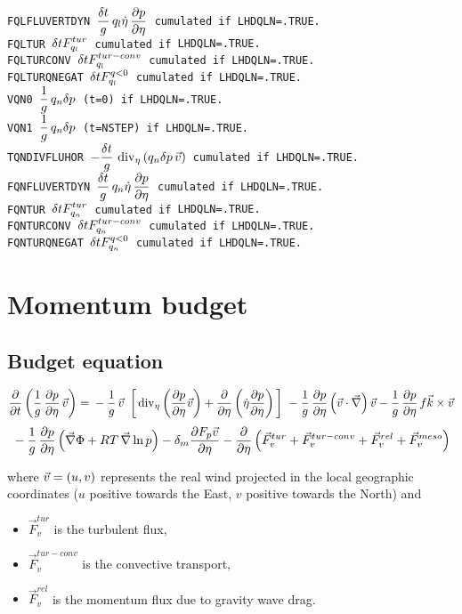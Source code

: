 \begin{tabbing}
\tt FQLFLUVERTDYN \> $\displaystyle\frac{\delta t}g \,q_l\dot\eta\,\frac{\displaystyle \partial p}{\displaystyle \partial \eta}$ \> cumulated \> if {\tt LHDQLN=.TRUE.}\\[1ex]
\tt FQLTUR \> $\displaystyle\delta t F_{q_l}^{tur}$ \> cumulated \> if {\tt LHDQLN=.TRUE.}\\
\tt FQLTURCONV \> $\displaystyle \delta t F_{q_l}^{tur-conv}$ \> cumulated \> if {\tt LHDQLN=.TRUE.}\\
\tt FQLTURQNEGAT \> $\displaystyle \delta t F_{q_l}^{q<0}$ \> cumulated \> if {\tt LHDQLN=.TRUE.}\\
\tt VQN0 \> $ \displaystyle\frac 1g\,q_n \delta p$ (t=0) \> \> if {\tt LHDQLN=.TRUE.}\\[1ex]
\tt VQN1 \> $ \displaystyle\frac 1g\,q_n \delta p$ (t=NSTEP) \> \> if {\tt LHDQLN=.TRUE.}\\[1ex]
\tt TQNDIVFLUHOR \> $\displaystyle - \frac{\delta t}g \,\mathop{\rm div}\nolimits_{\eta} \left( q_n \delta p \,\vec v \right)$ \> cumulated \> if {\tt LHDQLN=.TRUE.}\\[1ex]
\tt FQNFLUVERTDYN \> $\displaystyle\frac{\delta t}g \,q_n\dot\eta\,\frac{\displaystyle \partial p}{\displaystyle \partial \eta}$ \> cumulated \> if {\tt LHDQLN=.TRUE.}\\[1ex]
\tt FQNTUR \> $\displaystyle\delta t F_{q_n}^{tur}$ \> cumulated \> if {\tt LHDQLN=.TRUE.}\\
\tt FQNTURCONV \> $\displaystyle \delta t F_{q_n}^{tur-conv}$ \> cumulated \> if {\tt LHDQLN=.TRUE.}\\
\tt FQNTURQNEGAT \> $\displaystyle \delta t F_{q_n}^{q<0}$ \> cumulated \> if {\tt LHDQLN=.TRUE.}
\end{tabbing}

\section{Momentum budget}

\subsection*{Budget equation}
$$
        \DerP{}t \lp \frac 1g\,\DerP p{\eta} \,\vec v \rp = 
        \mb - \frac 1g\,\vec v \, \lc \divi{\eta}\lp\DerP{p}{\eta}\vec v \rp + \DerP{}{\eta}\lp\dot\eta \DerP{p}{\eta}\rp\rc
        \mb - \frac 1g\,\DerP{p}{\eta}\lp\vec v\cdot\grad\rp\vec v
        - \frac 1g\,\DerP p{\eta} \,f \vec k \times \vec v 
$$
$$
        \mb - \frac 1g \,\DerP p{\eta} \lp \grad \Phi + RT \,\grad \ln p \rp - \delta_m \DerP{\fp{} 
        \vec v}{\eta} - \DerP{}{\eta} \lp \vec F_v^{tur} + \vec F_v^{tur-conv} + \vec F_v^{rel}+ \vec F_v^{meso} \rp 
$$

\noi where $\vec v = \left( u,v \right)$ represents the real wind projected in the local geographic coordinates ($u$ positive towards the East, $v$ positive towards the North) and
\begin{itemize}
\item $\vec F_v^{tur}$ is the turbulent flux,
\item $\vec F_v^{tur-conv}$ is the convective transport,
\item $\vec F_v^{rel}$ is the momentum flux due to gravity wave drag.
\end{itemize}

